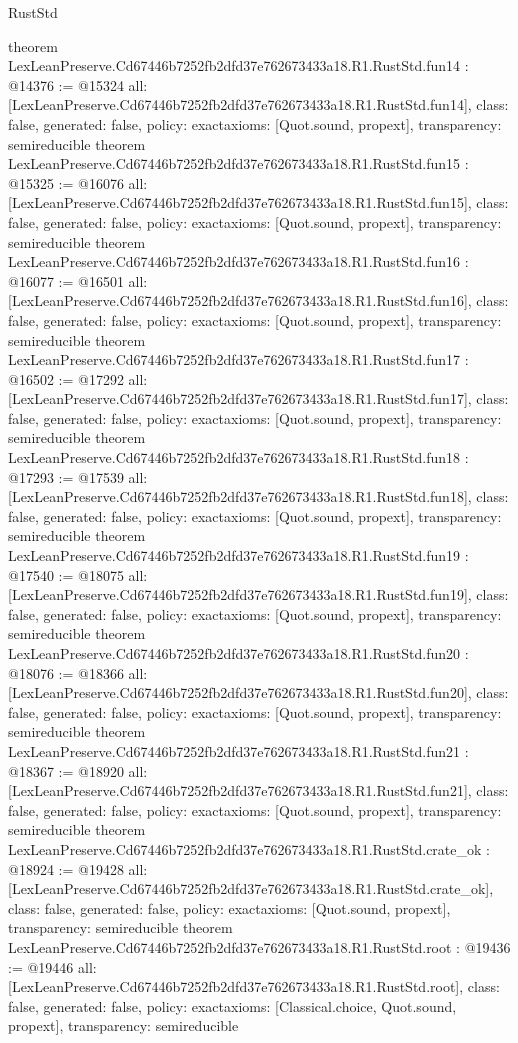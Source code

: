 \begin{lexlean}{RustStd}
\begin{coremodule}
{}
theorem LexLeanPreserve.Cd67446b7252fb2dfd37e762673433a18.R1.RustStd.fun14 : @14376 := @15324 {
  all: [LexLeanPreserve.Cd67446b7252fb2dfd37e762673433a18.R1.RustStd.fun14],
  class: false,
  generated: false,
  policy: exact{axioms: [Quot.sound, propext]},
  transparency: semireducible
}
theorem LexLeanPreserve.Cd67446b7252fb2dfd37e762673433a18.R1.RustStd.fun15 : @15325 := @16076 {
  all: [LexLeanPreserve.Cd67446b7252fb2dfd37e762673433a18.R1.RustStd.fun15],
  class: false,
  generated: false,
  policy: exact{axioms: [Quot.sound, propext]},
  transparency: semireducible
}
theorem LexLeanPreserve.Cd67446b7252fb2dfd37e762673433a18.R1.RustStd.fun16 : @16077 := @16501 {
  all: [LexLeanPreserve.Cd67446b7252fb2dfd37e762673433a18.R1.RustStd.fun16],
  class: false,
  generated: false,
  policy: exact{axioms: [Quot.sound, propext]},
  transparency: semireducible
}
theorem LexLeanPreserve.Cd67446b7252fb2dfd37e762673433a18.R1.RustStd.fun17 : @16502 := @17292 {
  all: [LexLeanPreserve.Cd67446b7252fb2dfd37e762673433a18.R1.RustStd.fun17],
  class: false,
  generated: false,
  policy: exact{axioms: [Quot.sound, propext]},
  transparency: semireducible
}
theorem LexLeanPreserve.Cd67446b7252fb2dfd37e762673433a18.R1.RustStd.fun18 : @17293 := @17539 {
  all: [LexLeanPreserve.Cd67446b7252fb2dfd37e762673433a18.R1.RustStd.fun18],
  class: false,
  generated: false,
  policy: exact{axioms: [Quot.sound, propext]},
  transparency: semireducible
}
theorem LexLeanPreserve.Cd67446b7252fb2dfd37e762673433a18.R1.RustStd.fun19 : @17540 := @18075 {
  all: [LexLeanPreserve.Cd67446b7252fb2dfd37e762673433a18.R1.RustStd.fun19],
  class: false,
  generated: false,
  policy: exact{axioms: [Quot.sound, propext]},
  transparency: semireducible
}
theorem LexLeanPreserve.Cd67446b7252fb2dfd37e762673433a18.R1.RustStd.fun20 : @18076 := @18366 {
  all: [LexLeanPreserve.Cd67446b7252fb2dfd37e762673433a18.R1.RustStd.fun20],
  class: false,
  generated: false,
  policy: exact{axioms: [Quot.sound, propext]},
  transparency: semireducible
}
theorem LexLeanPreserve.Cd67446b7252fb2dfd37e762673433a18.R1.RustStd.fun21 : @18367 := @18920 {
  all: [LexLeanPreserve.Cd67446b7252fb2dfd37e762673433a18.R1.RustStd.fun21],
  class: false,
  generated: false,
  policy: exact{axioms: [Quot.sound, propext]},
  transparency: semireducible
}
theorem LexLeanPreserve.Cd67446b7252fb2dfd37e762673433a18.R1.RustStd.crate_ok : @18924 := @19428 {
  all: [LexLeanPreserve.Cd67446b7252fb2dfd37e762673433a18.R1.RustStd.crate_ok],
  class: false,
  generated: false,
  policy: exact{axioms: [Quot.sound, propext]},
  transparency: semireducible
}
theorem LexLeanPreserve.Cd67446b7252fb2dfd37e762673433a18.R1.RustStd.root : @19436 := @19446 {
  all: [LexLeanPreserve.Cd67446b7252fb2dfd37e762673433a18.R1.RustStd.root],
  class: false,
  generated: false,
  policy: exact{axioms: [Classical.choice, Quot.sound, propext]},
  transparency: semireducible
}


\end{coremodule}
\end{lexlean}
